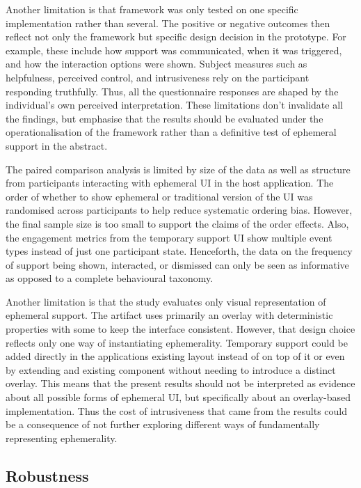 Another limitation is that framework was only tested on one specific implementation rather than several. The positive or negative outcomes then reflect not only the framework but specific design decision in the prototype. For example, these include how support was communicated, when it was triggered, and how the interaction options were shown. Subject measures such as helpfulness, perceived control, and intrusiveness rely on the participant responding truthfully. Thus, all the questionnaire responses are shaped by the individual's own perceived interpretation. These limitations don't invalidate all the findings, but emphasise that the results should be evaluated under the operationalisation of the framework rather than a definitive test of ephemeral support in the abstract.

The paired comparison analysis is limited by size of the data as well as structure from participants interacting with ephemeral UI in the host application. The order of whether to show ephemeral or traditional version of the UI was randomised across participants to help reduce systematic ordering bias. However, the final sample size is too small to support the claims of the order effects. Also, the engagement metrics from the temporary support UI show multiple event types instead of just one participant state. Henceforth, the data on the frequency of support being shown, interacted, or dismissed can only be seen as informative as opposed to a complete behavioural taxonomy.

Another limitation is that the study evaluates only visual representation of ephemeral support. The artifact uses primarily an overlay with deterministic properties with some to keep the interface consistent. However, that design choice reflects only one way of instantiating ephemerality. Temporary support could be added directly in the applications existing layout instead of on top of it or even by extending and existing component without needing to introduce a distinct overlay. This means that the present results should not be interpreted as evidence about all possible forms of ephemeral UI, but specifically about an overlay-based implementation. Thus the cost of intrusiveness that came from the results could be a consequence of not further exploring different ways of fundamentally representing ephemerality.

\subsection{Robustness}

